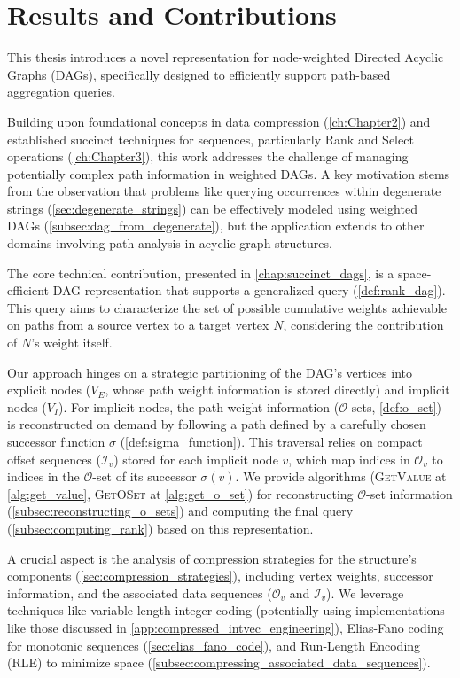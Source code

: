 \section{Results and Contributions}
\label{sec:results_contributions}

This thesis introduces a novel representation for node-weighted Directed Acyclic Graphs (DAGs), specifically designed to efficiently support path-based aggregation queries.

Building upon foundational concepts in data compression (\autoref{ch:Chapter2}) and established succinct techniques for sequences, particularly Rank and Select operations (\autoref{ch:Chapter3}), this work addresses the challenge of managing potentially complex path information in weighted DAGs. A key motivation stems from the observation that problems like querying occurrences within degenerate strings (\autoref{sec:degenerate_strings}) can be effectively modeled using weighted DAGs (\autoref{subsec:dag_from_degenerate}), but the application extends to other domains involving path analysis in acyclic graph structures.

The core technical contribution, presented in \autoref{chap:succinct_dags}, is a space-efficient DAG representation that supports a generalized \Rank{} query (\ref{def:rank_dag}). This query aims to characterize the set of possible cumulative weights achievable on paths from a source vertex to a target vertex $N$, considering the contribution of $N$'s weight itself.

Our approach hinges on a strategic partitioning of the DAG's vertices into explicit nodes ($V_E$, whose path weight information is stored directly) and implicit nodes ($V_I$). For implicit nodes, the path weight information ($\mathcal{O}$-sets, \ref{def:o_set}) is reconstructed on demand by following a path defined by a carefully chosen successor function $\sigma$ (\ref{def:sigma_function}). This traversal relies on compact offset sequences ($\mathcal{I}_v$) stored for each implicit node $v$, which map indices in $\mathcal{O}_v$ to indices in the $\mathcal{O}$-set of its successor $\sigma(v)$. We provide algorithms (\textsc{GetValue} at \ref{alg:get_value}, \textsc{GetOSet} at \ref{alg:get_o_set}) for reconstructing $\mathcal{O}$-set information (\autoref{subsec:reconstructing_o_sets}) and computing the final \Rank{} query (\autoref{subsec:computing_rank}) based on this representation.

A crucial aspect is the analysis of compression strategies for the structure's components (\autoref{sec:compression_strategies}), including vertex weights, successor information, and the associated data sequences ($\mathcal{O}_v$ and $\mathcal{I}_v$). We leverage techniques like variable-length integer coding (potentially using implementations like those discussed in \autoref{app:compressed_intvec_engineering}), Elias-Fano coding for monotonic sequences (\autoref{sec:elias_fano_code}), and Run-Length Encoding (RLE) to minimize space (\autoref{subsec:compressing_associated_data_sequences}).

